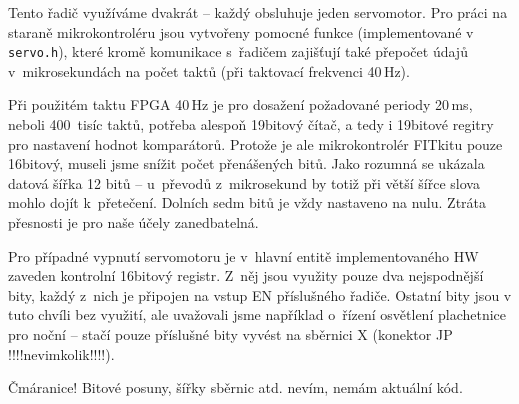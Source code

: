 Tento řadič využíváme dvakrát -- každý obsluhuje jeden servomotor. Pro práci na
staraně mikrokontroléru jsou vytvořeny pomocné funkce (implementované v
\texttt{servo.h}), které kromě komunikace s~řadičem zajišťují také přepočet
údajů v~mikrosekundách na počet taktů (při taktovací frekvenci 40\,Hz).

Při použitém taktu FPGA 40\,Hz je pro dosažení požadované periody 20\,ms, neboli
400~tisíc taktů, potřeba alespoň 19bitový čítač, a tedy i 19bitové regitry pro
nastavení hodnot komparátorů. Protože je ale mikrokontrolér FITkitu pouze
16bitový, museli jsme snížit počet přenášených bitů. Jako rozumná se ukázala
datová šířka 12 bitů -- u~převodů z~mikrosekund by totiž při větší šířce slova
mohlo dojít k~přetečení. Dolních sedm bitů je vždy nastaveno na nulu. Ztráta
přesnosti je pro naše účely zanedbatelná.

Pro případné vypnutí servomotoru je v~hlavní entitě implementovaného HW zaveden
kontrolní 16bitový registr. Z~něj jsou využity pouze dva nejspodnější bity,
každý z~nich je připojen na vstup EN příslušného řadiče. Ostatní bity jsou v
tuto chvíli bez využití, ale uvažovali jsme například o~řízení osvětlení
plachetnice pro noční  -- stačí pouze příslušné bity vyvést na
sběrnici X (konektor JP !!!!nevimkolik!!!!).



Čmáranice! Bitové posuny, šířky sběrnic atd. nevím, nemám aktuální kód.


